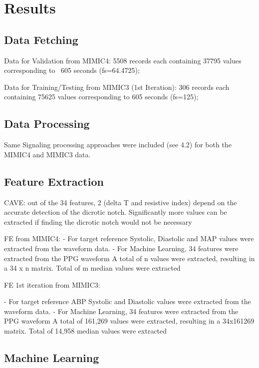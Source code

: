 \documentclass[12pt, bibliography=totoc]{scrartcl}
\begin{document}
\section{Results}
\label{sec:results}

\subsection{Data Fetching}
\label{subsec:data_fetching}

Data for Validation from MIMIC4:
5508 records each containing 37795 values corresponding to ~605 seconds (fs=64.4725);

Data for Training/Testing from MIMIC3 (1st Iteration):
306 records each containing 75625 values corresponding to 605 seconds (fs=125);

\subsection{Data Processing}
\label{subsec:data_processing}

Same Signaling processing approaches were included (see 4.2) for both the MIMIC4 and MIMIC3 data.

\subsection{Feature Extraction}
\label{subsec:feature_extraction}

CAVE: out of the 34 features, 2 (delta T and resistive index) depend on the accurate detection of the dicrotic notch.
Significantly more values can be extracted if finding the dicrotic notch would not be necessary

FE from MIMIC4:
- For target reference Systolic, Diastolic and MAP values were extracted from the waveform data.
- For Machine Learning, 34 features were extracted from the PPG waveform
A total of n values were extracted, resulting in a 34 x n matrix.
Total of m median values were extracted

FE 1st iteration from MIMIC3:

- For target reference ABP Systolic and Diastolic values were extracted from the waveform data.
- For Machine Learning, 34 features were extracted from the PPG waveform
A total of 161,269 values were extracted, resulting in a 34x161269 matrix.
Total of 14,958 median values were extracted

\subsection{Machine Learning}
\label{subsec:machine_learning}
\end{document}
